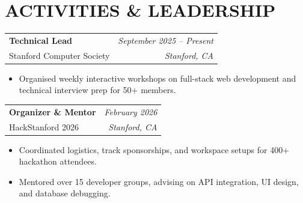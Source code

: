 \documentclass[10pt,letterpaper]{article}
\makeatletter
\newcommand{\entrybreak}{\vspace{0.8mm}}
\newcommand{\resumeentry}[4]{%
  \noindent
  \begin{tabularx}{\linewidth}{@{}X r@{}}
    {\bfseries\color{darkneutral}#1} & {\color{muted}\small\itshape #2} \\
    {\color{muted}\small #3} & {\color{muted}\small\itshape #4} \\
  \end{tabularx}%
  \vspace{0.2mm}%
}
\makeatother
\begin{document}
\section{ACTIVITIES \& LEADERSHIP}
\resumeentry{Technical Lead}{September 2025 -- Present}{Stanford Computer Society}{Stanford, CA}
\begin{itemize}
  \item Organised weekly interactive workshops on full-stack web development and technical interview prep for 50+ members.
\end{itemize}

\entrybreak

\resumeentry{Organizer \& Mentor}{February 2026}{HackStanford 2026}{Stanford, CA}
\begin{itemize}
  \item Coordinated logistics, track sponsorships, and workspace setups for 400+ hackathon attendees.
  \item Mentored over 15 developer groups, advising on API integration, UI design, and database debugging.
\end{itemize}
\end{document}
